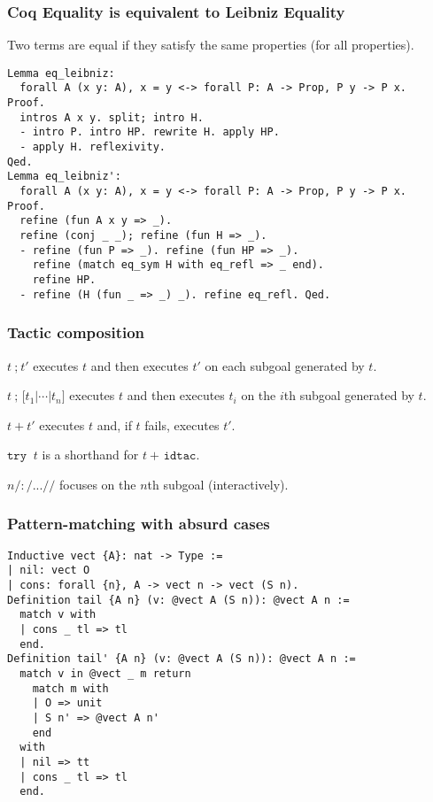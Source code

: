 \documentclass{beamer}
\begin{document}
\begin{frame}[fragile]
  \frametitle{Coq Equality is equivalent to Leibniz Equality}

  \begin{definition}
    Two terms are equal if they satisfy the same properties (for all properties).
  \end{definition}
\small
\begin{verbatim}
Lemma eq_leibniz:
  forall A (x y: A), x = y <-> forall P: A -> Prop, P y -> P x.
Proof.
  intros A x y. split; intro H.
  - intro P. intro HP. rewrite H. apply HP.
  - apply H. reflexivity.
Qed. 
Lemma eq_leibniz':
  forall A (x y: A), x = y <-> forall P: A -> Prop, P y -> P x.
Proof.
  refine (fun A x y => _).
  refine (conj _ _); refine (fun H => _).
  - refine (fun P => _). refine (fun HP => _).
    refine (match eq_sym H with eq_refl => _ end).
    refine HP.
  - refine (H (fun _ => _) _). refine eq_refl. Qed.
\end{verbatim}
\end{frame}
\begin{frame}[fragile]
  \frametitle{Tactic composition}

  \(t ~ \texttt{;} ~ t'\)
  executes \(t\) and then executes \(t'\) on each subgoal
  generated by \(t\).

  \vfill

  \(t ~ \texttt{; [}t_1 \texttt{|} \cdots \texttt{|} t_n\texttt{]}\)
  executes \(t\) and then executes \(t_i\) on the \(i\)th subgoal
  generated by \(t\).

  \vfill

  \(t ~ \texttt{+} ~ t'\)
  executes \(t\) and, if \(t\) fails, executes \(t'\).

  \(\texttt{try } ~ t\) is a shorthand for \(t ~ \texttt{+ idtac}\).

  \vfill

  \(n \texttt/:{/ ... \texttt/}/\)
  focuses on the \(n\)th subgoal (interactively).
\end{frame}
\begin{frame}[fragile]
  \frametitle{Pattern-matching with absurd cases}

\begin{verbatim}  
Inductive vect {A}: nat -> Type := 
| nil: vect O
| cons: forall {n}, A -> vect n -> vect (S n).
Definition tail {A n} (v: @vect A (S n)): @vect A n :=
  match v with
  | cons _ tl => tl
  end.
Definition tail' {A n} (v: @vect A (S n)): @vect A n :=
  match v in @vect _ m return
    match m with
    | O => unit
    | S n' => @vect A n'
    end
  with
  | nil => tt
  | cons _ tl => tl
  end.
\end{verbatim}
\end{frame}
\end{document}

